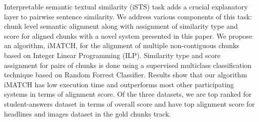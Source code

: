 Interpretable semantic textual similarity (iSTS) task adds a crucial explanatory layer to pairwise sentence similarity. We address various components of this task: chunk level semantic alignment along with assignment of similarity type and score for aligned chunks with a novel system presented in this paper. We propose an algorithm, iMATCH, for the alignment of multiple non-contiguous chunks based on Integer Linear Programming (ILP). Similarity type and score assignment for pairs of chunks is done using a supervised multiclass classification technique based on Random Forrest Classifier. Results show that our algorithm iMATCH has low execution time and outperforms most other participating systems in terms of alignment score. Of the three datasets, we are top ranked for student-answers dataset in terms of overall score and have top alignment score for headlines and images dataset in the gold chunks track.
